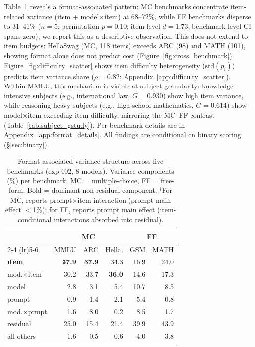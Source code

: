 Table~\ref{tab:cross_benchmark} reveals a format-associated pattern: MC benchmarks concentrate item-related variance (item + model$\times$item) at 68--72\%, while FF benchmarks disperse to 31--41\% ($n = 5$; permutation $p = 0.10$; item-level $d = 1.73$, benchmark-level CI spans zero); we report this as a descriptive observation. This does not extend to item budgets: HellaSwag (MC, 118 items) exceeds ARC (98) and MATH (101), showing format alone does not predict cost (Figure~\ref{fig:cross_benchmark}). Figure~\ref{fig:difficulty_scatter} shows item difficulty heterogeneity ($\text{std}(p_i)$) predicts item variance share ($\rho = 0.82$; Appendix~\ref{app:difficulty_scatter}). Within MMLU, this mechanism is visible at subject granularity: knowledge-intensive subjects (e.g., international law, $G = 0.930$) show high item variance, while reasoning-heavy subjects (e.g., high school mathematics, $G = 0.614$) show model$\times$item exceeding item difficulty, mirroring the MC--FF contrast (Table~\ref{tab:subject_gstudy}). Per-benchmark details are in Appendix~\ref{app:format_details}. All findings are conditional on binary scoring (\S\ref{sec:binary}).

\begin{table}[t]
\centering
\caption{Format-associated variance structure across five benchmarks (exp-002, 8 models). Variance components (\%) per benchmark; MC = multiple-choice, FF = free-form. Bold = dominant non-residual component. $^\dagger$For MC, reports prompt$\times$item interaction (prompt main effect $<$1\%); for FF, reports prompt main effect (item-conditional interactions absorbed into residual).}
\label{tab:cross_benchmark}
\scriptsize
\begin{tabular}{l rrr rr}
\toprule
 & \multicolumn{3}{c}{MC} & \multicolumn{2}{c}{FF} \\
\cmidrule(lr){2-4} \cmidrule(lr){5-6}
 & MMLU & ARC & Hella. & GSM & MATH \\
\midrule
\textbf{item} & \textbf{37.9} & \textbf{37.9} & 34.3 & 16.9 & 24.0 \\
mod.$\times$item & 30.2 & 33.7 & \textbf{36.0} & 14.6 & 17.3 \\
model & 2.8 & 3.1 & 5.4 & 10.7 & 8.5 \\
prompt$^\dagger$ & 0.9 & 1.4 & 2.1 & 5.4 & 0.8 \\
mod.$\times$prmpt & 1.6 & 8.0 & 0.2 & 8.5 & 1.7 \\
residual & 25.0 & 15.4 & 21.4 & 39.9 & 43.9 \\
all others & 1.6 & 0.5 & 0.6 & 4.0 & 3.8 \\
\bottomrule
\end{tabular}
\end{table}

